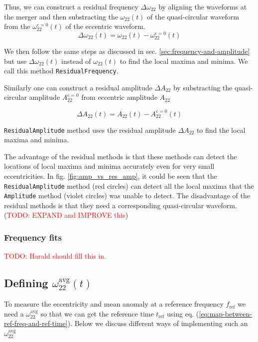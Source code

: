 \documentclass[aps,prd,amsmath,floats,floatfix, twocolumn,
superscriptaddress,nofootinbib,showpacs]{revtex4-1}
\newcommand{\red}{\textcolor{red}}
\newcommand{\TODO}[1]{\red{TODO: #1}}
\newcommand{\avgOmega}{\omega^{\text{avg}}_{22}}
\newcommand{\zeroA}{A_{22}^{e=0}}
\newcommand{\zeroOmega}{\omega_{22}^{e=0}}
\newcommand{\tref}{t_{\text{ref}}}
\newcommand{\fref}{f_{\text{ref}}}
\newcommand{\mAmp}{\texttt{Amplitude}}
\newcommand{\mResAmp}{\texttt{ResidualAmplitude}}
\newcommand{\mResFreq}{\texttt{ResidualFrequency}}
\newcommand{\resAmp}{\Delta A_{22}}
\newcommand{\resOmega}{\Delta \omega_{22}}
\begin{document}
Thus, we can construct a residual
frequency $\resOmega$ by aligning the waveforms at the merger
and then substracting the $\omega_{22}(t)$ of the quasi-circular
waveform from the $\zeroOmega(t)$ of the eccentric waveform.
\begin{equation}
  \label{eq:residual-omega22}
  \resOmega(t) = \omega_{22}(t) - \zeroOmega(t)
\end{equation}

We then follow the same steps as discussed in
sec. \ref{sec:frequency-and-amplitude} but use $\resOmega(t)$
instead of $\omega_{22}(t)$ to find the local maxima and minima. We
call this method \mResFreq{}.

Similarly one can construct a residual amplitude $\resAmp$ by
substracting the quasi-circular amplitude $\zeroA$ from
eccentric amplitude $A_{22}$

\begin{equation}
  \label{eq:residual-amplitude}
  \resAmp(t) = A_{22}(t) - \zeroA(t)
\end{equation}

\mResAmp{} method uses the residual amplitude $\Delta
A_{22}$ to find the local maxima and minima.

The advantage of the residual methods is that these methods can detect
the locations of local maxima and minima accurately even for very
small eccentricities. In fig. \ref{fig:amp_vs_res_amp}, it could be
seen that the \mResAmp{} method (red circles) can detect all the local
maxima that the \mAmp{} method (violet circles) was unable to
detect. The disadvantage of the residual methods is that they need a
corresponding quasi-circular waveform. (\TODO{EXPAND and IMPROVE
this})

\subsubsection{Frequency fits}
\label{sec:frequenc-fits}

\TODO{Harald should fill this in.}

\subsection{Defining $\avgOmega(t)$}
\label{sec:definig-average-omega22}

To measure the eccentricity and mean anomaly at a reference frequency $\fref$
we need a $\avgOmega$ so that we can get the reference
time $\tref$ using
eq. (\ref{eq:map-between-ref-freq-and-ref-time}). Below we discuss
different ways of implementing such an $\avgOmega$
\end{document}
